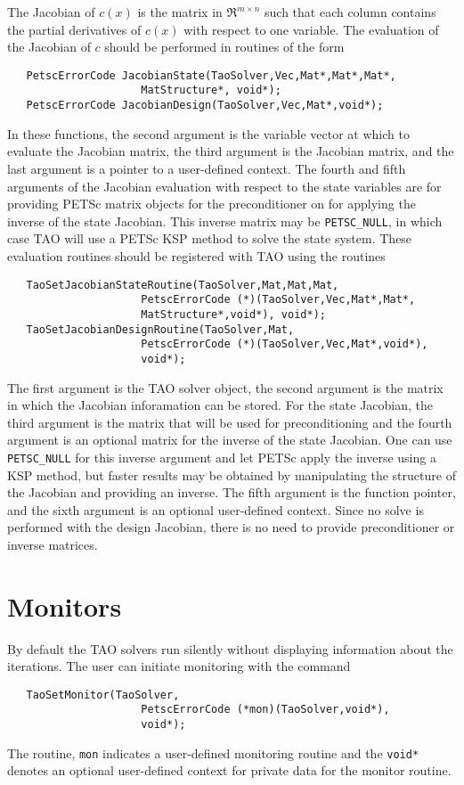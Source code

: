 The Jacobian of $c(x)$ is the matrix in $\Re^{m \times n}$ such that each 
column contains the partial derivatives of $c(x)$ with respect to one 
variable.  The evaluation of the Jacobian of $c$ should be performed 
in routines of the form
\begin{verbatim}
   PetscErrorCode JacobianState(TaoSolver,Vec,Mat*,Mat*,Mat*,
                     MatStructure*, void*);
   PetscErrorCode JacobianDesign(TaoSolver,Vec,Mat*,void*);
\end{verbatim}
\noindent
In these functions, the second argument is the variable vector at which to 
evaluate the Jacobian matrix, the third argument is the Jacobian matrix,
and the last argument is a pointer to a user-defined context. The fourth and
fifth arguments of the Jacobian evaluation with respect to the state variables
are for providing PETSc matrix objects for the preconditioner on for applying
the inverse of the state Jacobian.  This inverse matrix may be 
{\tt PETSC\_NULL}, in which case TAO will use a PETSc KSP method to
solve the state system.  These evaluation routines should be registered 
with TAO using the routines
\begin{verbatim}
   TaoSetJacobianStateRoutine(TaoSolver,Mat,Mat,Mat,
                     PetscErrorCode (*)(TaoSolver,Vec,Mat*,Mat*,
                     MatStructure*,void*), void*);
   TaoSetJacobianDesignRoutine(TaoSolver,Mat,
                     PetscErrorCode (*)(TaoSolver,Vec,Mat*,void*), 
                     void*);
\end{verbatim}
The first argument is the TAO solver object, the second argument is the matrix 
in which the Jacobian inforamation can be stored.  For the state Jacobian, the 
third argument is the matrix that will be used for preconditioning and the 
fourth argument is an optional matrix for the inverse of the state Jacobian.
One can use {\tt PETSC\_NULL} for this inverse argument and let PETSc apply 
the inverse using a KSP method, but faster results may be obtained by
manipulating the structure of the Jacobian and providing an inverse.
The fifth argument is the function pointer, and the sixth argument is
an optional user-defined context.  Since no solve is performed with the
design Jacobian, there is no need to provide preconditioner or inverse
matrices.

\section{Monitors}

By default the TAO solvers run silently without displaying information
about the iterations. The user can initiate monitoring with the
command  
\begin{verbatim}
   TaoSetMonitor(TaoSolver,
                     PetscErrorCode (*mon)(TaoSolver,void*),
                     void*);
\end{verbatim}
\noindent
The routine, {\tt mon} indicates a user-defined monitoring routine
and the {\tt void*} denotes an optional user-defined context for private 
data for the monitor routine.

